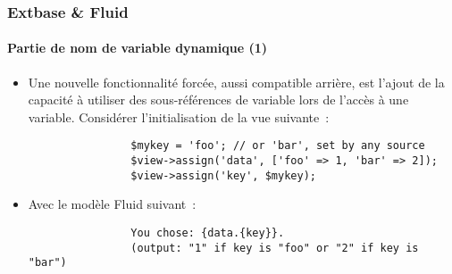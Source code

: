 \begin{frame}[fragile]
	\frametitle{Extbase \& Fluid}
	\framesubtitle{Partie de nom de variable dynamique (1)}

	\lstset{basicstyle=\tiny\ttfamily}

	\begin{itemize}

		\item Une nouvelle fonctionnalité forcée, aussi compatible arrière, est
			l'ajout de la capacité à utiliser des sous-références de variable
			lors de l'accès à une variable. Considérer l'initialisation de la
			vue suivante~:

			\begin{lstlisting}
				$mykey = 'foo'; // or 'bar', set by any source
				$view->assign('data', ['foo' => 1, 'bar' => 2]);
				$view->assign('key', $mykey);
			\end{lstlisting}

		\item Avec le modèle Fluid suivant~:

			\begin{lstlisting}
				You chose: {data.{key}}.
				(output: "1" if key is "foo" or "2" if key is "bar")
			\end{lstlisting}

	\end{itemize}

\end{frame}


